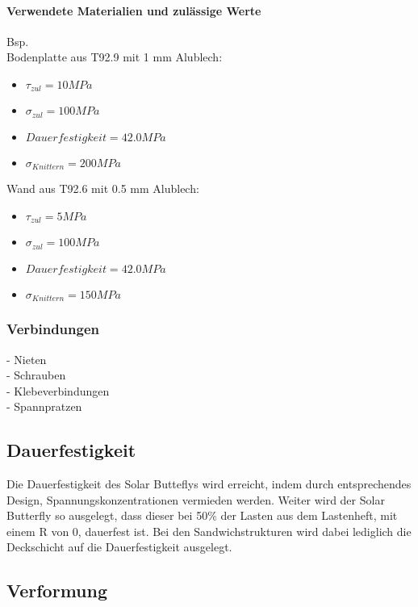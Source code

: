     \paragraph{Verwendete Materialien und zulässige Werte}
    Bsp.\\
    Bodenplatte aus T92.9 mit 1 mm Alublech:
    \begin{itemize}
      \item $\tau_{zul} = 10 MPa$
      \item $\sigma_{zul} = 100 MPa$
      \item $Dauerfestigkeit = 42.0 MPa$
      \item $\sigma_{Knittern} = 200 MPa$
    \end{itemize}
    Wand aus T92.6 mit 0.5 mm Alublech:
    \begin{itemize}
      \item $\tau_{zul} = 5 MPa$
      \item $\sigma_{zul} = 100 MPa$
      \item $Dauerfestigkeit = 42.0 MPa$
      \item $\sigma_{Knittern} = 150 MPa$
    \end{itemize}

  \subsubsection{Verbindungen}
    - Nieten\\
    - Schrauben\\
    - Klebeverbindungen\\
    - Spannpratzen\\

  \subsection{Dauerfestigkeit}
  Die Dauerfestigkeit des Solar Butteflys wird erreicht, indem durch entsprechendes Design, Spannungskonzentrationen vermieden werden. Weiter wird der Solar Butterfly so ausgelegt, dass dieser bei 50\% der Lasten aus dem Lastenheft, mit einem R von 0, dauerfest ist. Bei den Sandwichstrukturen wird dabei lediglich die Deckschicht auf die Dauerfestigkeit ausgelegt.

  \subsection{Verformung}
